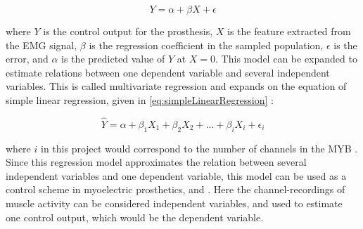 \begin{equation} \label{eq:simpleLinearRegression}
Y = \alpha + \beta X + \epsilon
\end{equation}

where $Y$ is the control output for the prosthesis, $X$ is the feature extracted from the EMG signal, $\beta$ is the regression coefficient in the sampled population, $\epsilon$ is the error, and $\alpha$ is the predicted value of $Y$ at $X = 0$.
This model can be expanded to estimate relations between one dependent variable and several independent variables. This is called multivariate regression and expands on the equation of simple linear regression, given in \eqref{eq:simpleLinearRegression} \cite{Zar2009}:

\begin{equation} \label{eq:multiLinearRegression}
\hat{Y} = \alpha + \beta_1 X_{1} + \beta_2 X_{2} + ... + \beta_i X_{i} + \epsilon_i
\end{equation} 

where $i$ in this project would correspond to the number of channels in the MYB \cite{Zar2009}. Since this regression model approximates the relation between several independent variables and one dependent variable, this model can be used as a control scheme in myoelectric prosthetics, and . Here the channel-recordings of muscle activity can be considered independent variables, and used to estimate one control output, which would be the dependent variable. \cite{Bruun2017}

